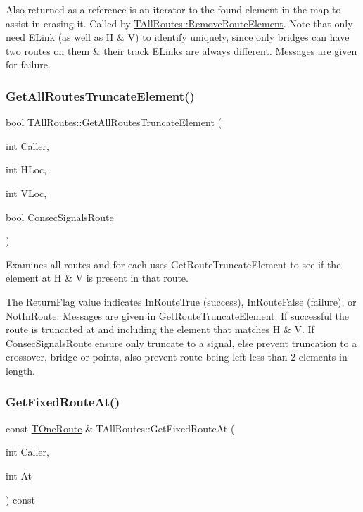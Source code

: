 Also returned as a reference is an iterator to the found element in the map to assist in erasing it. Called by \mbox{\hyperlink{class_t_all_routes_aacbc3765d695c99cf64ad2826792508f}{T\+All\+Routes\+::\+Remove\+Route\+Element}}. Note that only need E\+Link (as well as H \& V) to identify uniquely, since only bridges can have two routes on them \& their track E\+Links are always different. Messages are given for failure. \mbox{\label{class_t_all_routes_a0f3313fe1870b98a63cbc0deda000d4e}} 
\subsubsection{\texorpdfstring{Get\+All\+Routes\+Truncate\+Element()}{GetAllRoutesTruncateElement()}}
{\footnotesize\ttfamily bool T\+All\+Routes\+::\+Get\+All\+Routes\+Truncate\+Element (\begin{DoxyParamCaption}\item[{int}]{Caller,  }\item[{int}]{H\+Loc,  }\item[{int}]{V\+Loc,  }\item[{bool}]{Consec\+Signals\+Route }\end{DoxyParamCaption})}

Examines all routes and for each uses Get\+Route\+Truncate\+Element to see if the element at H \& V is present in that route.

The Return\+Flag value indicates In\+Route\+True (success), In\+Route\+False (failure), or Not\+In\+Route. Messages are given in Get\+Route\+Truncate\+Element. If successful the route is truncated at and including the element that matches H \& V. If Consec\+Signals\+Route ensure only truncate to a signal, else prevent truncation to a crossover, bridge or points, also prevent route being left less than 2 elements in length. \mbox{\label{class_t_all_routes_a7d9f820738af6314f2b9a4a1f52bb64a}} 
\subsubsection{\texorpdfstring{Get\+Fixed\+Route\+At()}{GetFixedRouteAt()}}
{\footnotesize\ttfamily const \mbox{\hyperlink{class_t_one_route}{T\+One\+Route}} \& T\+All\+Routes\+::\+Get\+Fixed\+Route\+At (\begin{DoxyParamCaption}\item[{int}]{Caller,  }\item[{int}]{At }\end{DoxyParamCaption}) const}

